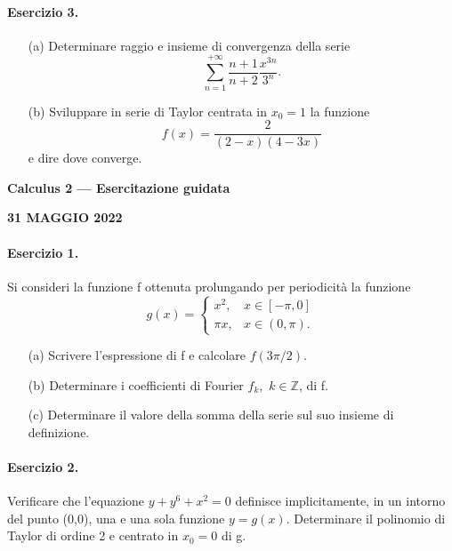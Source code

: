 \documentclass[a4paper, 10pt]{article}
\newcommand{\sectiontitle}[1]{\begin{center}\large\bfseries #1\end{center}}
\newcommand{\exercisecenter}[1]{\begin{center}\bfseries #1\end{center}}
\begin{document}
\paragraph{Esercizio 3.}
\begin{enumerate}
    \item[(a)] Determinare raggio e insieme di convergenza della serie
    \[ \sum_{n=1}^{+\infty}\frac{n+1}{n+2}\frac{x^{3n}}{3^{n}}. \]
    \item[(b)] Sviluppare in serie di Taylor centrata in $x_{0}=1$ la funzione
    \[ f(x)=\frac{2}{(2-x)(4-3x)} \]
    e dire dove converge.
\end{enumerate}

\newpage

\sectiontitle{Calculus 2 --- Esercitazione guidata}
\exercisecenter{31 MAGGIO 2022}

\paragraph{Esercizio 1.} Si consideri la funzione f ottenuta prolungando per periodicità la funzione
\[ g(x)=\begin{cases}x^{2},&x\in[-\pi,0]\\ \pi x,&x\in(0,\pi).\end{cases} \]
\begin{enumerate}
    \item[(a)] Scrivere l'espressione di f e calcolare $f(3\pi/2)$.
    \item[(b)] Determinare i coefficienti di Fourier $f_{k},$ $k\in\mathbb{Z}$, di f.
    \item[(c)] Determinare il valore della somma della serie sul suo insieme di definizione.
\end{enumerate}

\paragraph{Esercizio 2.} Verificare che l'equazione $y+y^{6}+x^{2}=0$ definisce implicitamente, in un intorno del punto (0,0), una e una sola funzione $y=g(x)$. Determinare il polinomio di Taylor di ordine 2 e centrato in $x_{0}=0$ di g.
\end{document}
